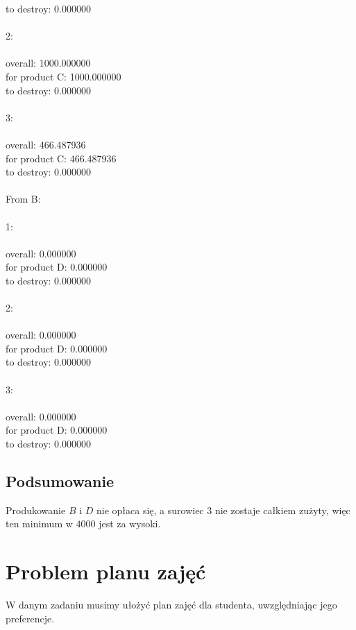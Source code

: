 \documentclass[12pt, a4paper]{article}
\begin{document}
{     to destroy:    0.000000\\\\
  2:\\\\
     overall:       1000.000000\\
     for product C: 1000.000000\\
     to destroy:    0.000000\\\\
  3:\\\\
     overall:       466.487936\\
     for product C: 466.487936\\
     to destroy:    0.000000\\\\
From B:\\\\
  1:\\\\
     overall:       0.000000\\
     for product D: 0.000000\\
     to destroy:    0.000000\\\\
  2:\\\\
     overall:       0.000000\\
     for product D: 0.000000\\
     to destroy:    0.000000\\\\
  3:\\\\
     overall:       0.000000\\
     for product D: 0.000000\\
     to destroy:    0.000000\\}

\subsection{Podsumowanie}

Produkowanie $B$ i $D$ nie opłaca się, a surowiec 3 nie zostaje całkiem zużyty, więc ten minimum w $4000$ jest za wysoki.

\section{Problem planu zajęć}

W danym zadaniu musimy ułożyć plan zajęć dla studenta, uwzględniając jego preferencje.
\end{document}
